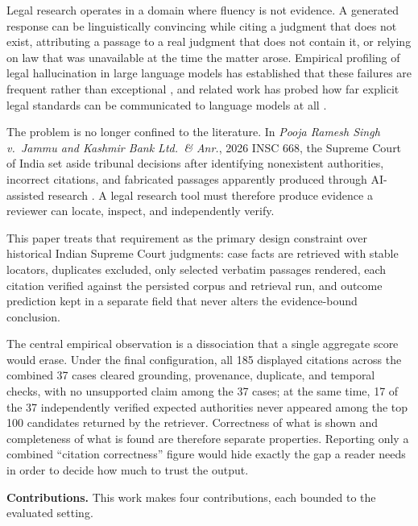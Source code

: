 \documentclass[conference]{IEEEtran}
\begin{document}
Legal research operates in a domain where fluency is not evidence. A generated
response can be linguistically convincing while citing a judgment that does not
exist, attributing a passage to a real judgment that does not contain it, or
relying on law that was unavailable at the time the matter arose. Empirical
profiling of legal hallucination in large language models has established that
these failures are frequent rather than exceptional \cite{dahl2024}, and related
work has probed how far explicit legal standards can be communicated to language
models at all \cite{nay2023}.

The problem is no longer confined to the literature. In \emph{Pooja Ramesh Singh
v.\ Jammu and Kashmir Bank Ltd.\ \& Anr.}, 2026 INSC 668, the Supreme Court of
India set aside tribunal decisions after identifying nonexistent authorities,
incorrect citations, and fabricated passages apparently produced through
AI-assisted research \cite{poojasingh2026}. A legal research tool must therefore
produce evidence a reviewer can
locate, inspect, and independently verify.

This paper treats that requirement as the primary design constraint over
historical Indian Supreme Court judgments: case facts are retrieved with
stable locators,
duplicates excluded, only
selected verbatim passages rendered, each citation verified against
the persisted corpus and retrieval run, and outcome prediction kept in a
separate field that never alters the evidence-bound conclusion.

The central empirical observation is a dissociation that a single aggregate
score would erase. Under the final configuration, all 185 displayed citations
across the combined 37 cases
cleared grounding, provenance, duplicate, and temporal checks, with no
unsupported claim among the 37 cases; at the same time, 17 of the 37 independently
verified expected authorities never appeared among the top 100 candidates
returned by the retriever. Correctness of what is shown and completeness of
what is found are therefore separate properties. Reporting only a combined
``citation correctness'' figure would hide
exactly the gap a reader needs in order to decide how much to trust the
output.

\textbf{Contributions.} This work makes four contributions, each bounded to the
evaluated setting.
\end{document}
